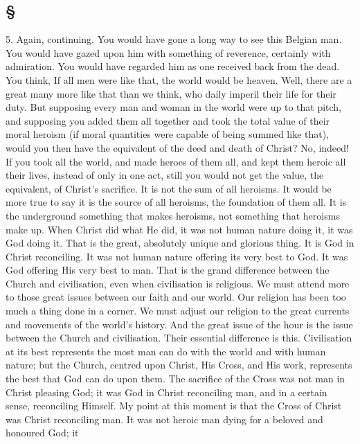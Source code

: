 \documentclass[draft]{ptfdoc}
\begin{document}
\subsection*{ \S } 

5. Again, continuing. You would have gone a 
long way to see this Belgian man. You would 
have gazed upon him with something of reverence, 
certainly with admiration. You would 
have regarded him as one received back from 
the dead. You think, If all men were like that, 
the world would be heaven. Well, there are a 
great many more like that than we think, who 
daily imperil their life for their duty. But 
supposing every man and woman in the world 
were up to that pitch, and supposing you added 
them all together and took the total value of 
their moral heroism (if moral quantities were 
capable of being summed like that), would you 
then have the equivalent of the deed and death 
of Christ? No, indeed! If you took all the 
world, and made heroes of them all, and kept 
them heroic all their lives, instead of only in one 
act, still you would not get the value, the equivalent, 
of Christ's sacrifice. It is not the sum of all 
heroisms. It would be more true to say it is the 
source of all heroisms, the foundation of them 
all. It is the underground something that makes 
heroisms, not something that heroisms make 
up. When Christ did what He did, it was not 
human nature doing it, it was God doing it. 
That is the great, absolutely unique and 
glorious thing. It is God in Christ reconciling. 
It was not human nature offering its very best 
to God. It was God offering His very best to 
man. That is the grand difference between the 
Church and civilisation, even when civilisation 
is religious. We must attend more to those 
great issues between our faith and our world. 
Our religion has been too much a thing done 
in a corner. We must adjust our religion to 
the great currents and movements of the 
world's history. And the great issue of the 
hour is the issue between the Church and 
civilisation. Their essential difference is this. 
Civilisation at its best represents the most 
man can do with the world and with human 
nature; but the Church, centred upon Christ, 
His Cross, and His work, represents the best 
that God can do upon them. The sacrifice 
of the Cross was not man in Christ pleasing 
God; it was God in Christ reconciling man, 
and in a certain sense, reconciling Himself. My 
point at this moment is that the Cross of Christ 
was Christ reconciling man. It was not heroic 
man dying for a beloved and honoured God; it
\end{document}
